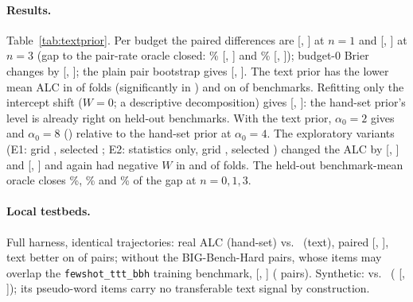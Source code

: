 \documentclass{article}
\begin{document}
\paragraph{Results.} Table~\ref{tab:textprior}. Per budget the paired differences are \TpDiffBudOneMean{} [\TpDiffBudOneLo, \TpDiffBudOneHi] at $n=1$ and \TpDiffBudThreeMean{} [\TpDiffBudThreeLo, \TpDiffBudThreeHi] at $n=3$ (gap to the pair-rate oracle closed: \TpGapOne\% [\TpGapOneLo, \TpGapOneHi] and \TpGapThree\% [\TpGapThreeLo, \TpGapThreeHi]); budget-0 Brier changes by \TpDiffBZeroMean{} [\TpDiffBZeroLo, \TpDiffBZeroHi]; the plain pair bootstrap gives \TpDiffAlcPairBootMean{} [\TpDiffAlcPairBootLo, \TpDiffAlcPairBootHi]. The text prior has the lower mean ALC in \TpFoldsBetter{} of \TpNFolds{} folds (significantly in \TpFoldsSigBetter) and on \TpBenchBetter{} of \TpBenchN{} benchmarks. Refitting only the intercept shift ($W=0$; a descriptive decomposition) gives \TpDiffIntShiftMean{} [\TpDiffIntShiftLo, \TpDiffIntShiftHi]: the hand-set prior's level is already right on held-out benchmarks. With the text prior, $\alpha_0=2$ gives \TpDiffAlphaTwoMean{} and $\alpha_0=8$ \TpDiffAlphaEightMean{} (\TpDiffAlphaEightSig) relative to the hand-set prior at $\alpha_0=4$. The exploratory variants (E1: grid \TpEOneGrid, selected \TpEOneAlphas; E2: statistics only, grid \TpETwoGrid, selected \TpETwoAlphas) changed the ALC by \TpEOneDiffMean{} [\TpEOneDiffLo, \TpEOneDiffHi] and \TpETwoDiffMean{} [\TpETwoDiffLo, \TpETwoDiffHi] and again had negative $W$ in \TpEOneNegW{} and \TpETwoNegW{} of \TpNFolds{} folds. The held-out benchmark-mean oracle closes \TpBenchOracleGapZero\%, \TpBenchOracleGapOne\% and \TpBenchOracleGapThree\% of the gap at $n=0,1,3$.

\paragraph{Local testbeds.} Full harness, identical trajectories: real ALC \TpRFullHand{} (hand-set) vs.\ \TpRFullText{} (text), paired \TpRPairFullMean{} [\TpRPairFullLo, \TpRPairFullHi], text better on \TpRPairFullFrac{} of pairs; without the BIG-Bench-Hard pairs, whose items may overlap the \texttt{fewshot\_ttt\_bbh} training benchmark, \TpRNoBbhMean{} [\TpRNoBbhLo, \TpRNoBbhHi] (\TpRNoBbhN{} pairs). Synthetic: \TpSFullHand{} vs.\ \TpSFullText{} (\TpSPairFullMean{} [\TpSPairFullLo, \TpSPairFullHi]); its pseudo-word items carry no transferable text signal by construction.
\end{document}
